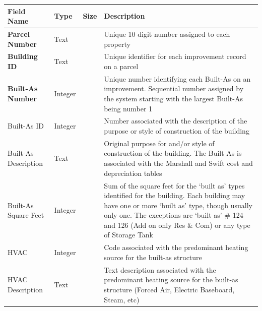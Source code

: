 \documentclass[
  english,
  letterpaper,
  DIV=11,
  numbers=noendperiod]{scrreprt}
\begin{document}
\begin{longtable}[]{@{}
  >{\raggedright\arraybackslash}p{}
  >{\raggedright\arraybackslash}p{}
  >{\raggedright\arraybackslash}p{}
  >{\raggedright\arraybackslash}p{}@{}}
\toprule\noalign{}
\begin{minipage}[b]{\linewidth}\raggedright
Field Name
\end{minipage} & \begin{minipage}[b]{\linewidth}\raggedright
Type
\end{minipage} & \begin{minipage}[b]{\linewidth}\raggedright
Size
\end{minipage} & \begin{minipage}[b]{\linewidth}\raggedright
Description
\end{minipage} \\
\midrule\noalign{}
\endhead
\bottomrule\noalign{}
\endlastfoot
\textbf{Parcel Number} & Text & 10 & Unique 10 digit number assigned to
each property \\
\textbf{Building ID} & Text & 5 & Unique identifier for each improvement
record on a parcel \\
\textbf{Built-As Number} & Integer & & Unique number identifying each
Built-As on an improvement. Sequential number assigned by the system
starting with the largest Built-As being number 1 \\
Built-As ID & Integer & & Number associated with the description of the
purpose or style of construction of the building \\
Built-As Description & Text & 255 & Original purpose for and/or style of
construction of the building. The Built As is associated with the
Marshall and Swift cost and depreciation tables \\
Built-As Square Feet & Integer & & Sum of the square feet for the `built
as' types identified for the building. Each building may have one or
more `built as' type, though usually only one. The exceptions are `built
as' \# 124 and 126 (Add on only Res \& Com) or any type of Storage
Tank \\
HVAC & Integer & & Code associated with the predominant heating source
for the built-as structure \\
HVAC Description & Text & 30 & Text description associated with the
predominant heating source for the built-as structure (Forced Air,
Electric Baseboard, Steam, etc) \\

\end{longtable}
\end{document}
